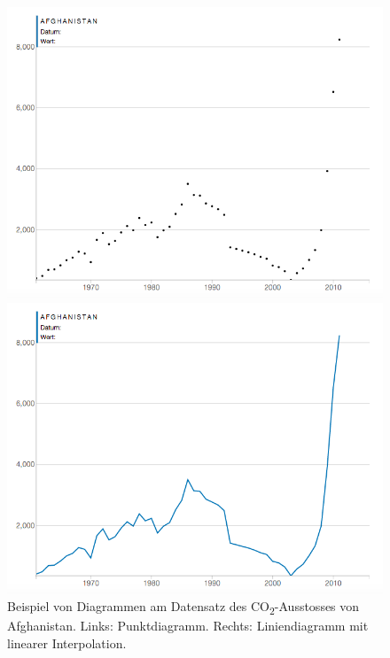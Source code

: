 \begin{figure}[!htbp]
	\centering
	\begin{minipage}{0.45\textwidth}
		\centering
		\includegraphics[width=\linewidth]{images/scatterplot_no_interpolation}
	\end{minipage}\hfill
	\begin{minipage}{0.45\textwidth}
		\centering
		\includegraphics[width=\linewidth]{images/scatterplot_interpolated}
	\end{minipage}
	\caption[Vergleich zwischen Punktdiagramm und Liniendiagramm]{Beispiel von Diagrammen am Datensatz des CO\textsubscript{2}-Ausstosses von Afghanistan. Links: Punktdiagramm. Rechts: Liniendiagramm mit linearer Interpolation.}
	\label{fig:scatterplot}
\end{figure}

